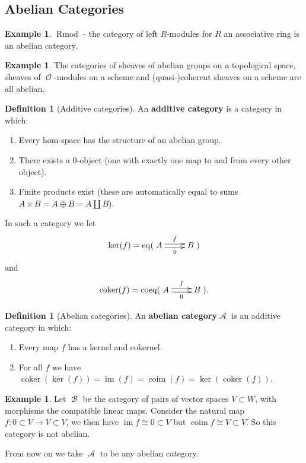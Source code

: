 \documentclass[10pt,]{book}
\newcommand{\terminology}[1]{\textbf{#1}}
\theoremstyle{plain}
\theoremstyle{definition}
\newtheorem{definition}[theorem]{Definition}
\newtheorem{example}[theorem]{Example}
\numberwithin{equation}{section}
\DeclareMathOperator{\im}{im}
\DeclareMathOperator{\coim}{coim}
\DeclareMathOperator{\coker}{coker}
\DeclareMathOperator{\eq}{eq}
\DeclareMathOperator{\coeq}{coeq}
\DeclareMathOperator{\Rmod}{R\text{mod}}
\DeclareMathOperator{\cA}{\mathcal{A}}
\DeclareMathOperator{\cB}{\mathcal{B}}
\DeclareMathOperator{\cO}{\mathcal{O}}
\begin{document}
\subsection[Abelian Categories]{Abelian Categories}\label{sec-ab-cats}
\begin{example}\label{example-1}
\(\Rmod\) - the category of left \(R\)-modules for \(R\) an associative ring is an abelian category.  \end{example}
\begin{example}\label{example-2}
The categories of sheaves of abelian groups on a topological space, sheaves of \(\cO\)-modules on a scheme and (quasi-)coherent sheaves on a scheme are all abelian.\end{example}
\begin{definition}[Additive categories]\label{definition-1}
An \terminology{additive category} is a category in which:
              \begin{enumerate}
\item{}Every hom-space has the structure of an abelian group.\item{}There exists a 0-object (one with exactly one map to and from every other object).\item{}Finite products exist (these are automatically equal to sums \(A\times B = A \oplus B = A \amalg B\)).\end{enumerate}

              In such a category we let \[\ker(f) = \eq(\xymatrix@+=2pc{A \ar@<0.5ex>[r]^f \ar@<-0.5ex>[r]_0 & B})\] and \[\coker(f) = \coeq(\xymatrix@+=2pc{A \ar@<0.5ex>[r]^f \ar@<-0.5ex>[r]_0 & B}).\]\end{definition}
\begin{definition}[Abelian categories]\label{definition-2}
An \terminology{abelian category}\(\cA\) is an additive category in which:
              \begin{enumerate}
\item{}Every map \(f\) has a kernel and cokernel.\item{}For all \(f\) we have \(\coker(\ker(f)) = \im(f) = \coim(f) = \ker(\coker(f))\).\end{enumerate}
\end{definition}
\begin{example}\label{example-3}
Let \(\cB\) be the category of pairs of vector spaces \(V\subset W\), with morphisms the compatible linear maps.
              Consider the natural map \(f\colon 0\subset V \to V\subset V\), we then have \(\im f \cong 0\subset V\) but \(\coim f \cong V\subset V\).
              So this category is not abelian.
            \end{example}
From now on we take \(\cA\) to be any abelian category.%
\typeout{************************************************}
\typeout{************************************************}
\end{document}
